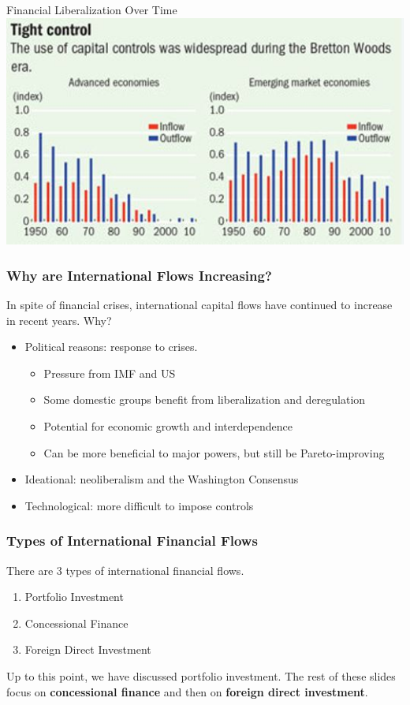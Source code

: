 \documentclass[handout]{beamer}
\begin{document}
\begin{frame}{\LARGE Financial Liberalization Over Time}
    \centering
\includegraphics[width=\textwidth,height=0.8\textheight,keepaspectratio]{capital account.JPG}
\end{frame}

\begin{frame} 
	\frametitle{\LARGE{Why are International Flows Increasing?}}
In spite of financial crises, international capital flows have continued to increase in recent years. Why?
	\begin{itemize}
			\item Political reasons: response to crises. \pause 
			\begin{itemize}
			    \item Pressure from IMF and US \pause 
			    \item Some domestic groups benefit from liberalization and deregulation \pause
			    \item Potential for economic growth and interdependence \pause
			    \item Can be more beneficial to major powers, but still be Pareto-improving \pause 
			\end{itemize}
			\item Ideational: neoliberalism and the Washington Consensus \pause 
			\item Technological: more difficult to impose controls 
	\end{itemize}
\end{frame}

\begin{frame} 
	\frametitle{\LARGE{Types of International Financial Flows}}
	There are 3 types of international financial flows.
	\begin{enumerate}
		\item Portfolio Investment
		\item Concessional Finance
		\item Foreign Direct Investment
	\end{enumerate}
	Up to this point, we have discussed portfolio investment. The rest of these slides focus on \textbf{concessional finance} and then on \textbf{foreign direct investment}.
\end{frame}
\end{document}
